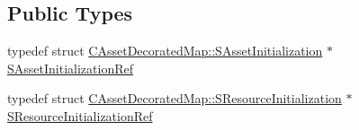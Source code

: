\subsection*{Public Types}
\begin{DoxyCompactItemize}
\item 
typedef struct \hyperlink{structCAssetDecoratedMap_1_1SAssetInitialization}{C\+Asset\+Decorated\+Map\+::\+S\+Asset\+Initialization} $\ast$ \hyperlink{classCAssetDecoratedMap_adf8214d7d7e6125410f23bc7cff260d3}{S\+Asset\+Initialization\+Ref}
\item 
typedef struct \hyperlink{structCAssetDecoratedMap_1_1SResourceInitialization}{C\+Asset\+Decorated\+Map\+::\+S\+Resource\+Initialization} $\ast$ \hyperlink{classCAssetDecoratedMap_a0ec7974cf6754e6891f10774ddafa527}{S\+Resource\+Initialization\+Ref}
\end{DoxyCompactItemize}
